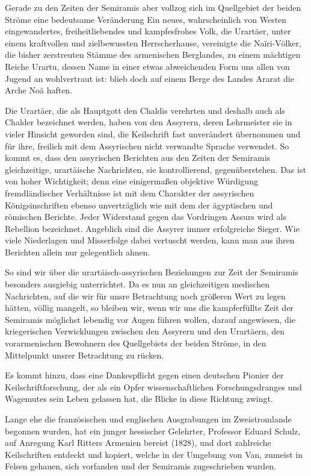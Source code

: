 \documentclass[a4paper, 11pt, oneside, polutonikogreek, german]{article}
\begin{document}
Gerade zu den Zeiten der Semiramis aber vollzog sich im Quellgebiet der beiden Ströme eine bedeutsame Veränderung Ein neues, wahrscheinlich von Westen eingewandertes, freiheitliebendes und kampfesfrohes Volk, die Urartäer, unter einem kraftvollen und zielbewussten Herrscherhause, vereinigte die Naïri-Völker, die bisher zerstreuten Stämme des armenischen Berglandes, zu einem mächtigen Reiche Urartu, dessen Name in einer etwas abweichenden Form uns allen von Jugend an wohlvertraut ist: blieb doch auf einem Berge des Landes Ararat die Arche Noä haften.

Die Urartäer, die als Hauptgott den Chaldis verehrten und deshalb auch als Chalder bezeichnet werden, haben von den Assyrern, deren Lehrmeister sie in vieler Hinsicht geworden sind, die Keilschrift fast unverändert übernommen und für ihre, freilich mit dem Assyrischen nicht verwandte Sprache verwendet. So kommt es, dass den assyrischen Berichten aus den Zeiten der Semiramis gleichzeitige, urartäische Nachrichten, sie kontrollierend, gegenüberstehen. Das ist von hoher Wichtigkeit; denn eine einigermaßen objektive Würdigung fremdländischer Verhältnisse ist mit dem Charakter der assyrischen Königsinschriften ebenso unverträglich wie mit dem der ägyptischen und römischen Berichte. Jeder Widerstand gegen das Vordringen Assurs wird als Rebellion bezeichnet. Angeblich sind die Assyrer immer erfolgreiche Sieger. Wie viele Niederlagen und Misserfolge dabei vertuscht werden, kann man aus ihren Berichten allein nur gelegentlich ahnen.

So sind wir über die urartäisch-assyrischen Beziehungen zur Zeit der Semiramis besonders ausgiebig unterrichtet. Da es nun an gleichzeitigen medischen Nachrichten, auf die wir für unsre Betrachtung noch größeren Wert zu legen hätten, völlig mangelt, so bleiben wir, wenn wir uns die kampferfüllte Zeit der Semiramis möglichst lebendig vor Augen führen wollen, darauf angewiesen, die kriegerischen Verwicklungen zwischen den Assyrern und den Urartäern, den vorarmenischen Bewohnern des Quellgebiets der beiden Ströme, in den Mittelpunkt unsrer Betrachtung zu rücken.

Es kommt hinzu, dass eine Dankespflicht gegen einen deutschen Pionier der Keilschriftforschung, der als ein Opfer wissenschaftlichen Forschungsdranges und Wagemutes sein Leben gelassen hat, die Blicke in diese Richtung zwingt.

Lange ehe die französischen und englischen Ausgrabungen im Zweistromlande begonnen wurden, hat ein junger hessischer Gelehrter, Professor Eduard Schulz, auf Anregung Karl Ritters Armenien bereist (1828), und dort zahlreiche Keilschriften entdeckt und kopiert, welche in der Umgebung von Van, zumeist in Felsen gehauen, sich vorfanden und der Semiramis zugeschrieben wurden.
\end{document}
